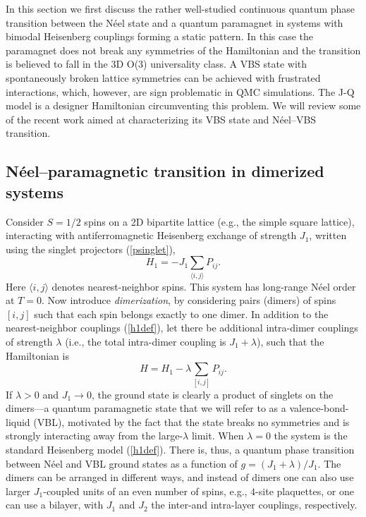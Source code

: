 \documentclass[10pt,pre,aps,twocolumn,showpacs,subscriptaddresses,floatfix]{revtex4}
\begin{document}
In this section we first discuss the rather well-studied continuous quantum phase transition between the N\'eel state and a quantum paramagnet in systems 
with bimodal Heisenberg couplings forming a static pattern. In this case the paramagnet does not break any symmetries of the Hamiltonian and the transition 
is believed to fall in the 3D O($3$) universality class. A VBS state with spontaneously broken lattice symmetries can be achieved with frustrated 
interactions, which, however, are sign problematic in QMC simulations. The J-Q model \cite{Sandvik07} is a designer Hamiltonian circumventing this 
problem. We will review some of the recent work aimed at characterizing its VBS state and  N\'eel--VBS transition.

\subsection{N\'eel--paramagnetic transition in dimerized systems}
\label{sec:dimermodels}

Consider $S=1/2$ spins on a 2D bipartite lattice (e.g., the simple square lattice), interacting with antiferromagnetic Heisenberg exchange of 
strength $J_1$, written using the singlet projectors (\ref{psinglet}),
\begin{equation}
H_1 = -J_1 \sum_{\langle i,j\rangle} P_{ij}.
\label{h1def}
\end{equation}
Here $\langle i,j\rangle$ denotes nearest-neighbor spins. This system has long-range N\'eel order at $T=0$. Now introduce {\it dimerization}, 
by considering pairs (dimers) of spins $[i,j]$ such that each spin belongs exactly to one dimer. In addition to the nearest-neighbor couplings (\ref{h1def}),
let there be additional intra-dimer couplings of strength $\lambda$ (i.e., the total intra-dimer coupling is $J_1+\lambda$), such that the Hamiltonian is
\begin{equation}
H = H_1  -\lambda \sum_{[ i,j]} P_{ij} .
\end{equation}
If $\lambda>0$ and $J_1\to 0$, the ground state is clearly a product of singlets on the dimers---a quantum paramagnetic state that we will refer
to as a valence-bond-liquid (VBL), motivated by the fact that the state breaks no symmetries and is strongly interacting away from the large-$\lambda$
limit. When $\lambda=0$  the system is the standard Heisenberg model (\ref{h1def}). There is, thus, a quantum phase transition between N\'eel and VBL ground 
states as a function of $g=(J_1+\lambda)/J_1$. The dimers can be arranged in different ways, and instead of dimers one can also use larger $J_1$-coupled 
units of an even number of spins, e.g., $4$-site plaquettes, or one can use a bilayer, with $J_1$ and $J_2$ the inter-and intra-layer couplings, respectively.
\end{document}
